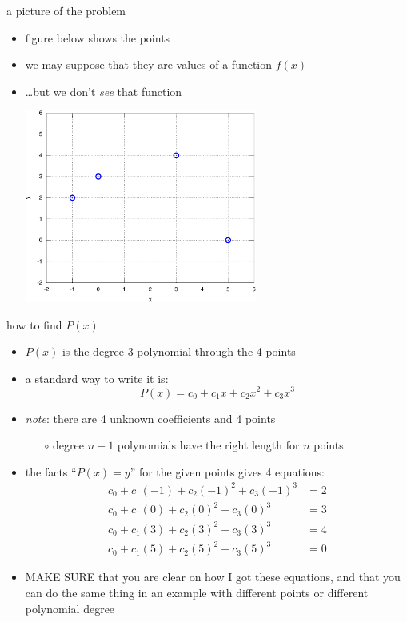 \documentclass[10pt,hyperref]{beamer}
\newcommand{\MS}{\alert{MAKE SURE}\xspace}
\begin{document}
\begin{frame}{a picture of the problem}

\begin{itemize}
\item figure below shows the points
\item we may suppose that they are values of a function $f(x)$
\item \dots but we don't \emph{see} that function

\medskip
  \begin{center}
  \includegraphics[width=0.6\textwidth]{ex1}
  \end{center}
\end{itemize}
\end{frame}


\begin{frame}{how to find $P(x)$}

\begin{itemize}
\item $P(x)$ is the degree 3 polynomial through the 4 points
\item a standard way to write it is:
	$$P(x) = c_0 + c_1 x + c_2 x^2 + c_3 x^3$$
\item \emph{note}: there are 4 unknown coefficients and 4 points
  \begin{itemize}
  \item[$\circ$] degree $n-1$ polynomials have the right length for $n$ points
  \end{itemize}
\item the facts ``$P(x)=y$'' for the given points gives 4 equations:
\begin{align*}
c_0 + c_1 (-1) + c_2 (-1)^2 + c_3 (-1)^3 &= 2 \\
c_0 + c_1 (0) + c_2 (0)^2 + c_3 (0)^3 &= 3 \\
c_0 + c_1 (3) + c_2 (3)^2 + c_3 (3)^3 &= 4 \\
c_0 + c_1 (5) + c_2 (5)^2 + c_3 (5)^3 &= 0
\end{align*}
\item \MS that you are clear on how I got these equations, and that you can do the same thing in an example with different points or different polynomial degree
\end{itemize}
\end{frame}
\end{document}
